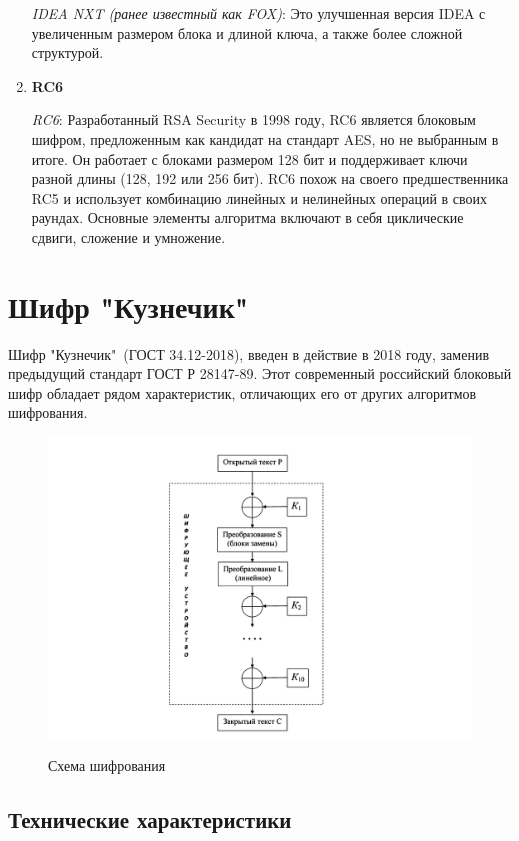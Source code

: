 \documentclass[colorthm]{../civarticle}
\begin{document}
\begin{enumerate}
\textit{IDEA NXT (ранее известный как FOX)}: Это улучшенная версия IDEA с увеличенным размером блока и длиной ключа, а также более сложной структурой.

\item \textbf{RC6}

\textit{RC6}: Разработанный RSA Security в 1998 году, RC6 является блоковым шифром, предложенным как кандидат на стандарт AES, но не выбранным в итоге. Он работает с блоками размером 128 бит и поддерживает ключи разной длины (128, 192 или 256 бит). RC6 похож на своего предшественника RC5 и использует комбинацию линейных и нелинейных операций в своих раундах. Основные элементы алгоритма включают в себя циклические сдвиги, сложение и умножение. 

\end{enumerate}



\section{Шифр "Кузнечик"\ }


Шифр "Кузнечик"\ (ГОСТ 34.12-2018), введен в действие в 2018 году, заменив предыдущий стандарт ГОСТ Р 28147-89. Этот современный российский блоковый шифр обладает рядом характеристик, отличающих его от других алгоритмов шифрования.

\begin{figure}[h]
{
\includegraphics[width=0.99\linewidth]{example/kuznechik1.png} } 

\caption{Схема шифрования}
\end{figure}

\subsection{Технические характеристики}
\end{document}
